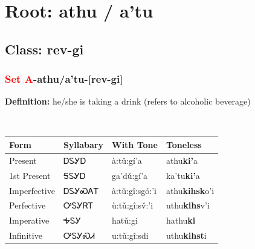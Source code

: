 \needspace{4in}
\section*{Root: athu / a'tu}
\nopagebreak
{}
\needspace{3in}
\subsection*{Class: rev-gi}
\nopagebreak
\needspace{2in}
\subsubsection*{\textcolor{Red}{Set A}{-}\textbf{athu/a'tu}{-}[rev-gi]}
\nopagebreak
\textbf{Definition: } he/she is taking a drink (refers to alcoholic beverage)
\\[0.5em]
\begin{tabularx}{\textwidth}{l X X X}%
\toprule%
\textbf{Form}&\textbf{Syllabary}&\textbf{With Tone}&\textbf{Toneless}\\%
\midrule%
Present&ᎠᏚᎩᎠ&à:tǔ:gí’a&athu\textbf{ki'}a\\%
1st Present&ᎦᏚᎩᎠ&ga’dǔ:gí’a&ka'tu\textbf{ki'}a\\%
Imperfective&ᎠᏚᎩᏍᎪᎢ&à:tǔ:gî:sgó:’i&athu\textbf{kihsk}o'i\\%
Perfective&ᎤᏚᎩᏒᎢ&ù:tǔ:gî:sv̌:’i&uthu\textbf{kihs}v'i\\%
Imperative&ᎭᏚᎩ&hatǔ:gi&hathu\textbf{ki}\\%
Infinitive&ᎤᏚᎩᏍᏗ&u:tǔ:gî:sdi&uthu\textbf{kihst}i\\%
\bottomrule%
\end{tabularx}
\\[1em]